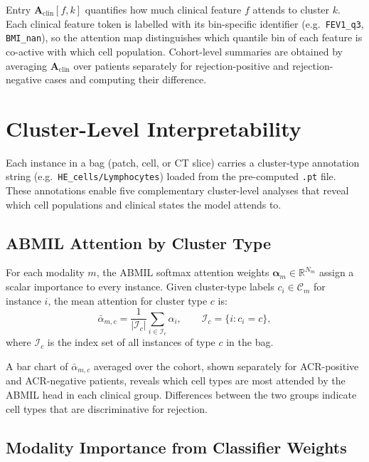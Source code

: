 \documentclass[11pt,a4paper]{article}
\begin{document}
Entry $\mathbf{A}_\text{clin}[f,k]$ quantifies how much clinical feature $f$
attends to cluster $k$.
Each clinical feature token is labelled with its bin-specific identifier
(e.g.\ \texttt{FEV1\_q3}, \texttt{BMI\_nan}), so the attention map
distinguishes which quantile bin of each feature is co-active with which
cell population.
Cohort-level summaries are obtained by averaging $\mathbf{A}_\text{clin}$
over patients separately for rejection-positive and rejection-negative cases
and computing their difference.

\section{Cluster-Level Interpretability}

Each instance in a bag (patch, cell, or CT slice) carries a cluster-type
annotation string (e.g.\ \texttt{HE\_cells/Lymphocytes}) loaded from the
pre-computed \texttt{.pt} file.
These annotations enable five complementary cluster-level analyses that reveal
which cell populations and clinical states the model attends to.

\subsection{ABMIL Attention by Cluster Type}

For each modality $m$, the ABMIL softmax attention weights
$\boldsymbol{\alpha}_m \in \mathbb{R}^{N_m}$ assign a scalar importance to
every instance.
Given cluster-type labels $c_i \in \mathcal{C}_m$ for instance $i$, the mean
attention for cluster type $c$ is:
\begin{equation}
    \bar{\alpha}_{m,c}
    = \frac{1}{|\mathcal{I}_c|}\sum_{i \in \mathcal{I}_c} \alpha_i,
    \qquad \mathcal{I}_c = \{i : c_i = c\},
    \label{eq:abmil_cluster}
\end{equation}
where $\mathcal{I}_c$ is the index set of all instances of type $c$ in the
bag.

A bar chart of $\bar{\alpha}_{m,c}$ averaged over the cohort, shown separately
for ACR-positive and ACR-negative patients, reveals which cell types are most
attended by the ABMIL head in each clinical group.
Differences between the two groups indicate cell types that are discriminative
for rejection.

\subsection{Modality Importance from Classifier Weights}
\end{document}
